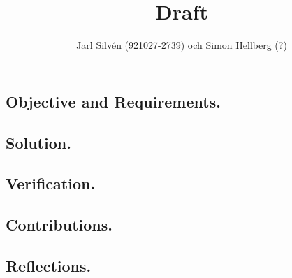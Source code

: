 \documentclass[a4paper,11pt,twoside]{article}
\title{Draft}
\author{Jarl Silvén (921027-2739) och Simon Hellberg (?)}
\date{\thedate}
\begin{document}
\maketitle

\newpage

\subsection*{Objective and Requirements.}

\subsection*{Solution.}

\subsection*{Verification.}

\subsection*{Contributions.}

\subsection*{Reflections.}
\end{document}
